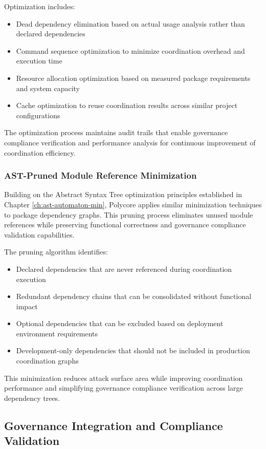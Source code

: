 Optimization includes:
\begin{itemize}
\item Dead dependency elimination based on actual usage analysis rather than declared dependencies
\item Command sequence optimization to minimize coordination overhead and execution time
\item Resource allocation optimization based on measured package requirements and system capacity
\item Cache optimization to reuse coordination results across similar project configurations
\end{itemize}

The optimization process maintains audit trails that enable governance compliance verification and performance analysis for continuous improvement of coordination efficiency.

\subsubsection{AST-Pruned Module Reference Minimization}

Building on the Abstract Syntax Tree optimization principles established in Chapter \ref{ch:ast-automaton-min}, Polycore applies similar minimization techniques to package dependency graphs. This pruning process eliminates unused module references while preserving functional correctness and governance compliance validation capabilities.

The pruning algorithm identifies:
\begin{itemize}
\item Declared dependencies that are never referenced during coordination execution
\item Redundant dependency chains that can be consolidated without functional impact
\item Optional dependencies that can be excluded based on deployment environment requirements
\item Development-only dependencies that should not be included in production coordination graphs
\end{itemize}

This minimization reduces attack surface area while improving coordination performance and simplifying governance compliance verification across large dependency trees.

\subsection{Governance Integration and Compliance Validation}

